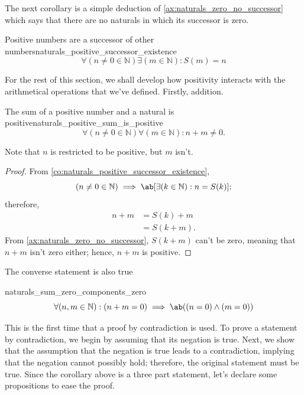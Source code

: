 The next corollary is a simple deduction of \cref{ax:naturals_zero_no_successor} which says that
there are no naturals in which its successor is zero.
\begin{cor}{Positive numbers are a successor of other numbers}{naturals_positive_successor_existence}
  \begin{equation*}
    \forall (n \neq 0 \in \mathbb{N}) \exists (m \in \mathbb{N}) : S(m) = n
  \end{equation*}
\end{cor}

For the rest of this section, we shall develop how positivity interacts with the arithmetical
operations that we've defined. Firstly, addition.

\begin{lemma}{The sum of a positive number and a natural is positive}{naturals_positive_sum_is_positive}
  \begin{equation*}
    \forall(n \neq 0 \in \mathbb{N})\forall(m \in \mathbb{N}) : n + m \neq 0.
  \end{equation*}
\end{lemma}
Note that \(n\) is restricted to be positive, but \(m\) isn't.

\begin{proof}
  From \cref{co:naturals_positive_successor_existence},
  \begin{equation}
    (n \neq 0 \in \mathbb{N}) \implies \ab[ \exists (k \in \mathbb{N}) : n = S(k) ];
  \end{equation}
  therefore,
  \begin{align}
    n + m & = S(k) + m  \\
          & = S(k + m).
  \end{align}
  From \cref{ax:naturals_zero_no_successor}, \(S(k + m)\) can't be zero, meaning that \(n + m\)
  isn't zero either; hence, \(n + m\) is positive.
\end{proof}

The converse statement is also true
\begin{cor}{}{naturals_sum_zero_components_zero}
  \begin{equation}
    \forall (n, m \in \mathbb{N}) : (n + m = 0) \implies \ab((n = 0) \land (m = 0))
  \end{equation}
\end{cor}

This is the first time that a proof by contradiction is used. To prove a statement by contradiction,
we begin by assuming that its negation is true. Next, we show that the assumption that the negation
is true leads to a contradiction, implying that the negation cannot possibly hold; therefore, the
original statement must be true. Since the corollary above is a three part statement, let's declare
some propositions to ease the proof.

